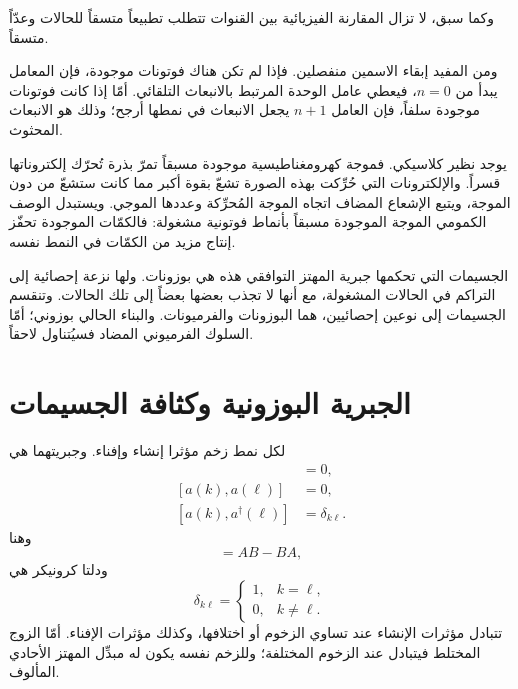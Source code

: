 وكما سبق، لا تزال المقارنة الفيزيائية بين القنوات تتطلب تطبيعاً متسقاً للحالات وعدّاً متسقاً.

\begin{classroomqa}
\end{classroomqa}

ومن المفيد إبقاء الاسمين منفصلين. فإذا لم تكن هناك فوتونات موجودة، فإن المعامل يبدأ من \(n=0\)، فيعطي عامل الوحدة المرتبط بالانبعاث التلقائي. أمّا إذا كانت فوتونات موجودة سلفاً، فإن العامل \(n+1\) يجعل الانبعاث في نمطها أرجح؛ وذلك هو الانبعاث المحثوث.

يوجد نظير كلاسيكي. فموجة كهرومغناطيسية موجودة مسبقاً تمرّ بذرة تُحرّك إلكتروناتها قسراً. والإلكترونات التي حُرِّكت بهذه الصورة تشعّ بقوة أكبر مما كانت ستشعّ من دون الموجة، ويتبع الإشعاع المضاف اتجاه الموجة المُحرِّكة وعددها الموجي. ويستبدل الوصف الكمومي الموجة الموجودة مسبقاً بأنماط فوتونية مشغولة: فالكمّات الموجودة تحفّز إنتاج مزيد من الكمّات في النمط نفسه.

الجسيمات التي تحكمها جبرية المهتز التوافقي هذه هي بوزونات. ولها نزعة إحصائية إلى التراكم في الحالات المشغولة، مع أنها لا تجذب بعضها بعضاً إلى تلك الحالات. وتنقسم الجسيمات إلى نوعين إحصائيين، هما البوزونات والفرميونات. والبناء الحالي بوزوني؛ أمّا السلوك الفرميوني المضاد فسيُتناول لاحقاً.

\section{الجبرية البوزونية وكثافة الجسيمات}

لكل نمط زخم مؤثرا إنشاء وإفناء. وجبريتهما هي
\begin{align}
[a^\dagger(k),a^\dagger(\ell)]&=0,\\
[a(k),a(\ell)]&=0,\\
[a(k),a^\dagger(\ell)]&=\delta_{k\ell}.
\end{align}
وهنا
\begin{equation}
[A,B]=AB-BA,
\end{equation}
ودلتا كرونيكر هي
\begin{equation}
\delta_{k\ell}=
\begin{cases}
1,&k=\ell,\\
0,&k\ne\ell.
\end{cases}
\end{equation}
تتبادل مؤثرات الإنشاء عند تساوي الزخوم أو اختلافها، وكذلك مؤثرات الإفناء. أمّا الزوج المختلط فيتبادل عند الزخوم المختلفة؛ وللزخم نفسه يكون له مبدِّل المهتز الأحادي المألوف.

